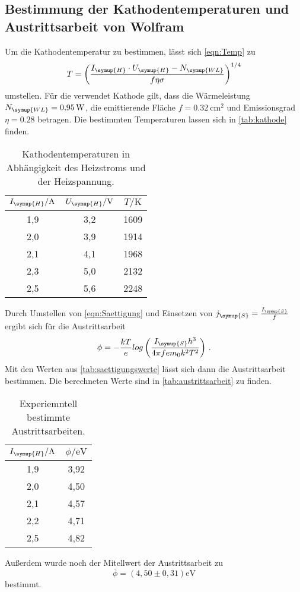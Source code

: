 \subsection{Bestimmung der Kathodentemperaturen und Austrittsarbeit von Wolfram}
\label{sec:Wolfram}
Um die Kathodentemperatur zu bestimmen, lässt sich \autoref{eqn:Temp} zu
\begin{equation*}
  T = \left(\frac{I_{\symup{H}}\cdot U_{\symup{H}}-N_{\symup{WL}}}{f\eta\sigma}\right)^{1/4}
\end{equation*}
umstellen. Für die verwendet Kathode gilt, dass die Wärmeleistung $N_{\symup{WL}}=\SI{0,95}{\watt}$, die
emittierende Fläche $f=\SI{0,32}{\centi\meter^2}$ und Emissionsgrad $\eta = 0.28$ betragen. Die bestimmten
Temperaturen lassen sich in \autoref{tab:kathode} finden.
\begin{table}
  \centering
  \caption{Kathodentemperaturen in Abhängigkeit des Heizstroms und der Heizspannung.}
  \label{tab:kathode}
  \begin{tabular}{c c c}
    \toprule
    $I_{\symup{H}}/\si{\ampere}$ & $U_{\symup{H}}/\si{\volt}$ & $T/\si{\kelvin}$ \\
    \midrule
    1,9 & 3,2 & 1609 \\
    2,0 & 3,9 & 1914 \\
    2,1 & 4,1 & 1968 \\
    2,3 & 5,0 & 2132 \\
    2,5 & 5,6 & 2248 \\
    \bottomrule
  \end{tabular}
\end{table}
Durch Umstellen von \autoref{eqn:Saettigung} und Einsetzen von $j_{\symup{S}}=\frac{I_{\symup{S}}}{f}$ ergibt sich
für die Austrittsarbeit
\begin{equation*}
  \phi = -\frac{kT}{e} log\left(\frac{I_{\symup{S}}h^3}{4\pi fem_{0}k^2 T^2}\right)\,.
\end{equation*}
Mit den Werten aus \autoref{tab:saettigungswerte} lässt sich dann die Austrittsarbeit bestimmen. Die berechneten
Werte sind in \autoref{tab:austrittsarbeit} zu finden.
\begin{table}
  \centering
  \caption{Experiemntell bestimmte Austrittsarbeiten.}
  \label{tab:austrittsarbeit}
  \begin{tabular}{c c}
    \toprule
    $I_{\symup{H}}/\si{\ampere}$ & $\phi/\si{\eV}$ \\
    \midrule
    1,9 & 3,92\\
    2,0 & 4,50\\
    2,1 & 4,57\\
    2,2 & 4,71\\
    2,5 & 4,82\\
    \bottomrule
  \end{tabular}
\end{table}
Außerdem wurde noch der Mitellwert der Austrittsarbeit zu
\begin{equation*}
  \bar{\phi} = (4,50 \pm 0,31)\si{\eV}
\end{equation*} 
bestimmt.